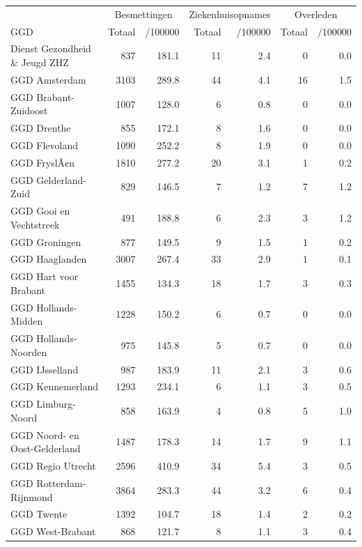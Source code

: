 \documentclass[
  english,
  man,floatsintext]{apa6}
\begin{document}
\begin{table}
\centering\begingroup\fontsize{10}{12}\selectfont

\begin{threeparttable}
\begin{tabular}{lrrrrrr}
\toprule
\multicolumn{1}{c}{ } & \multicolumn{2}{c}{Besmettingen} & \multicolumn{2}{c}{Ziekenhuisopnames} & \multicolumn{2}{c}{Overleden} \\
\cmidrule(l{3pt}r{3pt}){2-3} \cmidrule(l{3pt}r{3pt}){4-5} \cmidrule(l{3pt}r{3pt}){6-7}
GGD & Totaal & /100000 & Totaal & /100000 & Totaal & /100000\\
\midrule
Dienst Gezondheid \& Jeugd ZHZ & 837 & 181.1 & 11 & 2.4 & 0 & 0.0\\
GGD Amsterdam & 3103 & 289.8 & 44 & 4.1 & 16 & 1.5\\
GGD Brabant-Zuidoost & 1007 & 128.0 & 6 & 0.8 & 0 & 0.0\\
GGD Drenthe & 855 & 172.1 & 8 & 1.6 & 0 & 0.0\\
GGD Flevoland & 1090 & 252.2 & 8 & 1.9 & 0 & 0.0\\
GGD FryslÃ¢n & 1810 & 277.2 & 20 & 3.1 & 1 & 0.2\\
GGD Gelderland-Zuid & 829 & 146.5 & 7 & 1.2 & 7 & 1.2\\
GGD Gooi en Vechtstreek & 491 & 188.8 & 6 & 2.3 & 3 & 1.2\\
GGD Groningen & 877 & 149.5 & 9 & 1.5 & 1 & 0.2\\
GGD Haaglanden & 3007 & 267.4 & 33 & 2.9 & 1 & 0.1\\
GGD Hart voor Brabant & 1455 & 134.3 & 18 & 1.7 & 3 & 0.3\\
GGD Hollands-Midden & 1228 & 150.2 & 6 & 0.7 & 0 & 0.0\\
GGD Hollands-Noorden & 975 & 145.8 & 5 & 0.7 & 0 & 0.0\\
GGD IJsselland & 987 & 183.9 & 11 & 2.1 & 3 & 0.6\\
GGD Kennemerland & 1293 & 234.1 & 6 & 1.1 & 3 & 0.5\\
GGD Limburg-Noord & 858 & 163.9 & 4 & 0.8 & 5 & 1.0\\
GGD Noord- en Oost-Gelderland & 1487 & 178.3 & 14 & 1.7 & 9 & 1.1\\
GGD Regio Utrecht & 2596 & 410.9 & 34 & 5.4 & 3 & 0.5\\
GGD Rotterdam-Rijnmond & 3864 & 283.3 & 44 & 3.2 & 6 & 0.4\\
GGD Twente & 1392 & 104.7 & 18 & 1.4 & 2 & 0.2\\
GGD West-Brabant & 868 & 121.7 & 8 & 1.1 & 3 & 0.4\\

\end{tabular}
\end{threeparttable}
\end{table}
\end{document}

